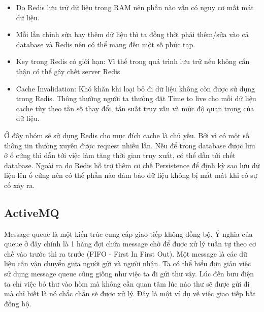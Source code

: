 \begin{itemize}
            \begin{itemize}
                \item Do Redis lưu trữ dữ liệu trong RAM nên phần nào vẫn có nguy cơ mất mát dữ liệu.
                \item Mỗi lần chỉnh sửa hay thêm dữ liệu thì ta đồng thời phải thêm/sửa vào cả database và Redis nên có thể mang đến một số phức tạp.
                \item Key trong Redis có giới hạn: Vì thế trong quá trình lưu trữ nếu không cẩn thận có thể gây chết server Redis
                \item Cache Invalidation: Khó khăn khi loại bỏ đi dữ liệu không còn được sử dụng trong Redis. Thông thường người ta thường đặt Time to live cho mỗi dữ liệu cache tùy theo tần số thay đổi, tần suất truy vấn và mức độ quan trọng của dữ liệu.
            \end{itemize}
            
            Ở đây nhóm sẽ sử dụng Redis cho mục đích cache là chủ yếu. Bởi vì có một số thông tin thường xuyên được request nhiều lần. Nếu để trong database được lưu ở ổ cứng thì dẫn tới việc làm tăng thời gian truy xuất, có thể dẫn tới chết database. Ngoài ra do Redis hỗ trợ thêm cơ chế Persistence để định kỳ sao lưu dữ liệu lên ổ cứng nên có thể phần nào đảm bảo dữ liệu không bị mất mát khi có sự cố xảy ra.
            
            \subsection{ActiveMQ}
            
            Message queue là một kiến trúc cung cấp giao tiếp không đồng bộ. Ý nghĩa của queue ở đây chính là 1 hàng đợi chứa message chờ để được xử lý tuần tự theo cơ chế vào trước thì ra trước (FIFO - First In First Out). Một message là các dữ liệu cần vận chuyển giữa người gửi và người nhận. Ta có thể hiểu đơn giản việc sử dụng message queue cũng giống như việc ta đi gửi thư vậy. Lúc đến bưu điện ta chỉ việc bỏ thư vào hòm mà không cần quan tâm lúc nào thư sẽ được gửi đi mà chỉ biết là nó chắc chắn sẽ được xử lý. Đây là một ví dụ về việc giao tiếp bất đồng bộ.
            
            \newpage
            

\end{itemize}

